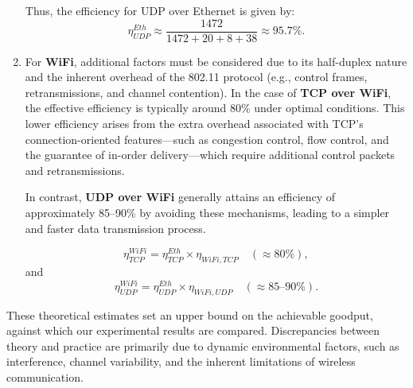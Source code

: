 \begin{enumerate}
                \noindent Thus, the efficiency for UDP over Ethernet is given by:
                \[
                \eta_{UDP}^{Eth} \approx \frac{1472}{1472 + 20 + 8 + 38} \approx 95.7\%.
                \]


            \item  
                For \textbf{WiFi}, additional factors must be considered due to its half-duplex nature and the inherent overhead of the 802.11 protocol (e.g., control frames, retransmissions, and channel contention). 
                In the case of \textbf{TCP over WiFi}, the effective efficiency is typically around 80\% under optimal conditions. 
                This lower efficiency arises from the extra overhead associated with TCP’s connection-oriented features—such as congestion control, 
                flow control, and the guarantee of in-order delivery—which require additional control packets and retransmissions. 
                
                In contrast, \textbf{UDP over WiFi} generally attains an efficiency of approximately 85–90\% by avoiding these mechanisms, 
                leading to a simpler and faster data transmission process.
        
                \[
                    \eta_{TCP}^{WiFi} = \eta_{TCP}^{Eth} \times \eta_{WiFi,TCP} \quad (\approx 80\%),
                \]
                and
                \[
                    \eta_{UDP}^{WiFi} = \eta_{UDP}^{Eth} \times \eta_{WiFi,UDP} \quad (\approx 85\text{–}90\%).
                \]
            
        \end{enumerate}

        \noindent These theoretical estimates set an upper bound on the achievable goodput, against which our experimental results are compared. 
        Discrepancies between theory and practice are primarily due to dynamic environmental factors, such as interference, channel variability, and the inherent limitations of wireless communication.

